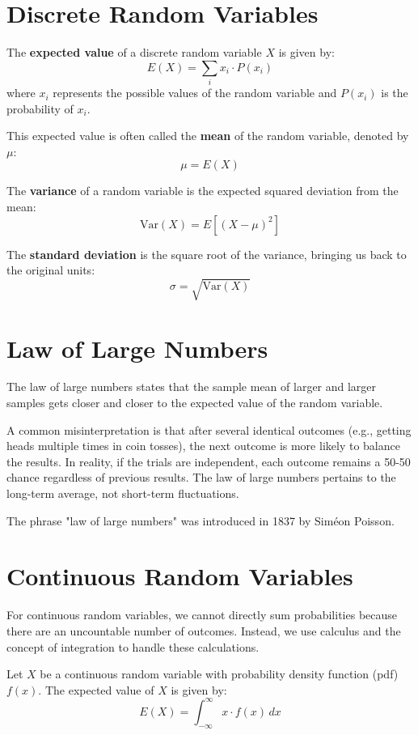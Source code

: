 \documentclass{article}
\begin{document}
\section*{Discrete Random Variables}

The \textbf{expected value} of a discrete random variable \(X\) is given by:
\[
E(X) = \sum_{i} x_i \cdot P(x_i)
\]
where \(x_i\) represents the possible values of the random variable and \(P(x_i)\) is the probability of \(x_i\).

This expected value is often called the \textbf{mean} of the random variable, denoted by \(\mu\):
\[
\mu = E(X)
\]

The \textbf{variance} of a random variable is the expected squared deviation from the mean:
\[
\text{Var}(X) = E[(X - \mu)^2]
\]

The \textbf{standard deviation} is the square root of the variance, bringing us back to the original units:
\[
\sigma = \sqrt{\text{Var}(X)}
\]

\section*{Law of Large Numbers}

The law of large numbers states that the sample mean of larger and larger samples gets closer and closer to the expected value of the random variable. 

A common misinterpretation is that after several identical outcomes (e.g., getting heads multiple times in coin tosses), the next outcome is more likely to balance the results. In reality, if the trials are independent, each outcome remains a 50-50 chance regardless of previous results. The law of large numbers pertains to the long-term average, not short-term fluctuations.

The phrase "law of large numbers" was introduced in 1837 by Siméon Poisson.

\section*{Continuous Random Variables}

For continuous random variables, we cannot directly sum probabilities because there are an uncountable number of outcomes. Instead, we use calculus and the concept of integration to handle these calculations.

Let \(X\) be a continuous random variable with probability density function (pdf) \(f(x)\). The expected value of \(X\) is given by:
\[
E(X) = \int_{-\infty}^{\infty} x \cdot f(x) \, dx
\]
\end{document}
